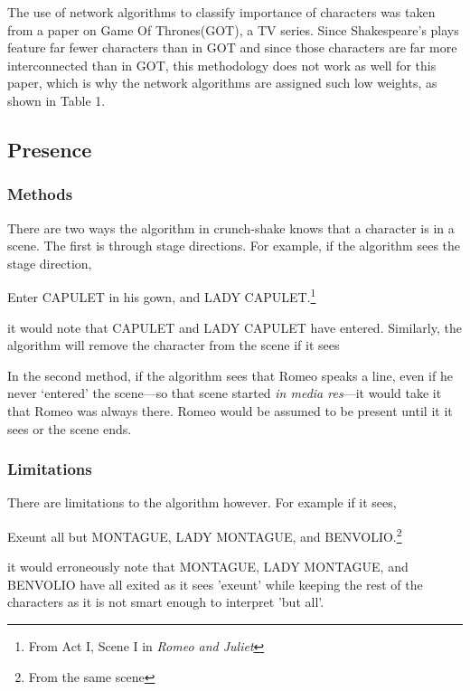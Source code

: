\documentclass[12pt]{article}
\begin{document}
The use of network algorithms to classify importance of characters was taken
from a paper on Game Of Thrones(GOT)\cite{got}, a TV series. Since
Shakespeare's plays feature far fewer characters than in GOT and since those
characters are far more interconnected than in GOT, this methodology does not
work as well for this paper, which is why the network algorithms are assigned
such low weights, as shown in Table 1.


\subsection{Presence}
\label{sub:presence}

\subsubsection{Methods}
\label{ssub:method}


There are two ways the algorithm in crunch-shake knows that a character
is in a scene. The first is through stage directions. For example, if the
algorithm sees the stage direction,
\begin{displayquote}
Enter CAPULET in his gown, and LADY CAPULET.\footnote{From Act
    I, Scene I in \emph{Romeo and Juliet}}
\end{displayquote}
it would note that CAPULET and LADY CAPULET have entered. Similarly, the
algorithm will remove the character from the scene if it sees 

In the second method, if the algorithm sees that Romeo speaks a line, even if he never
`entered' the scene---so that scene started \textit{in media res}---it would
take it that Romeo was always there. Romeo would be assumed to be present until
it it sees  or the scene ends.

\subsubsection{Limitations}
\label{ssub:limitations}

There are limitations to the algorithm however. For example if it sees,
\begin{displayquote}
Exeunt all but MONTAGUE, LADY MONTAGUE, and BENVOLIO.\footnote{From
the same scene}
\end{displayquote}
it would erroneously note that MONTAGUE, LADY MONTAGUE, and BENVOLIO have all
exited as it sees 'exeunt' while keeping the rest of the characters as it is
not smart enough to interpret 'but all'. 
\end{document}
